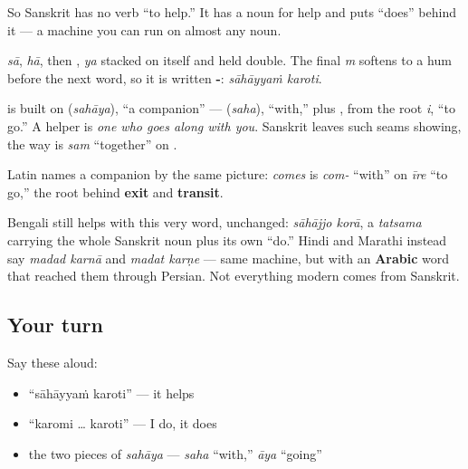 So Sanskrit has no verb \textquotedblleft{}to help.\textquotedblright{} It has a noun for help and puts \textquotedblleft{}does\textquotedblright{} behind it — a machine you can run on almost any noun.

\begin{sounds}
\textbf{} \emph{sā}, \textbf{} \emph{hā}, then \textbf{}, \textbf{} \emph{ya} stacked on itself and held double. The final \textbf{} \emph{m} softens to a hum before the next word, so it is written \textbf{-}: \emph{sāhāyyaṁ karoti}.
\end{sounds}

\begin{cousinweb}
\textbf{} is built on \textbf{} (\emph{sahāya}), \textquotedblleft{}a companion\textquotedblright{} — \textbf{} (\emph{saha}), \textquotedblleft{}with,\textquotedblright{} plus \textbf{}, from the root \emph{i}, \textquotedblleft{}to go.\textquotedblright{} A helper is \emph{one who goes along with you}. Sanskrit leaves such seams showing, the way \textbf{} is \emph{sam} \textquotedblleft{}together\textquotedblright{} on \textbf{}.

Latin names a companion by the same picture: \emph{comes} is \emph{com-} \textquotedblleft{}with\textquotedblright{} on \emph{īre} \textquotedblleft{}to go,\textquotedblright{} the root behind \textbf{exit} and \textbf{transit}.

Bengali still helps with this very word, unchanged: \emph{sāhājjo korā}, a \emph{tatsama} carrying the whole Sanskrit noun plus its own \textquotedblleft{}do.\textquotedblright{} Hindi and Marathi instead say \emph{madad karnā} and \emph{madat karṇe} — same machine, but with an \textbf{Arabic} word that reached them through Persian. Not everything modern comes from Sanskrit.
\end{cousinweb}

\subsection*{Your turn}
Say these aloud:

\begin{itemize}
\raggedright
  \item \textquotedblleft{}sāhāyyaṁ karoti\textquotedblright{} — it helps
  \item \textquotedblleft{}karomi … karoti\textquotedblright{} — I do, it does
  \item the two pieces of \emph{sahāya} — \emph{saha} \textquotedblleft{}with,\textquotedblright{} \emph{āya} \textquotedblleft{}going\textquotedblright{}
\end{itemize}

